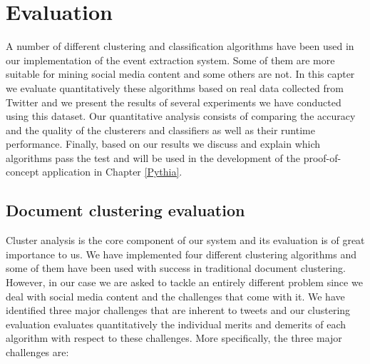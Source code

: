 \chapter{Evaluation}\label{Evaluation}
\ifpdf
    \graphicspath{{Chapter4/Chapter4Figs/PNG/}{Chapter4/Chapter4Figs/PDF/}{Chapter4/Chapter4Figs/}}
\else
    \graphicspath{{Chapter4/Chapter4Figs/EPS/}{Chapter4/Chapter4Figs/}}
\fi
A number of different clustering and classification algorithms have been used in our implementation of the event extraction system. 
Some of them are more suitable for mining social media content and some others are not. In this capter we evaluate quantitatively these algorithms 
based on real data collected from Twitter and we present the results of several experiments we have conducted using this dataset. 
Our quantitative analysis consists of comparing the accuracy and the quality of the clusterers and classifiers as well as their runtime performance. 
Finally, based on our results we discuss and explain which algorithms pass the test and will be used in the development of the proof-of-concept application in Chapter \ref{Pythia}.

\section{Document clustering evaluation}
Cluster analysis is the core component of our system and its evaluation is of great importance to us. We have implemented 
four different clustering algorithms and some of them have been used with success in traditional document clustering. However,
in our case we are asked to tackle an entirely different problem since we deal with social media content and the challenges that come with it. 
We have identified three major challenges that are inherent to tweets and our clustering evaluation evaluates quantitatively the individual merits and demerits 
of each algorithm with respect to these challenges. More specifically, the three major challenges are:

